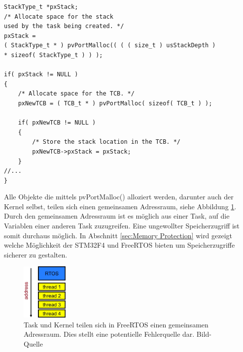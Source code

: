 \begin{lstlisting}[caption={FreeRTOS Source von xTaskCreate() aus Task.c. Jede Task bestitzt einen Stack und einen Task Control Block, beide werden beim Aufruf von xTaskCreate (Zeile 5 und Zeile 11) erstellt.}, linewidth=8cm,captionpos=b, label=lst:xTaskCreate, float=hbt]
StackType_t *pxStack;
/* Allocate space for the stack 
used by the task being created. */
pxStack = 
( StackType_t * ) pvPortMalloc(( ( ( size_t ) usStackDepth ) 
* sizeof( StackType_t ) ) );

if( pxStack != NULL )
{
	/* Allocate space for the TCB. */
	pxNewTCB = ( TCB_t * ) pvPortMalloc( sizeof( TCB_t ) );

	if( pxNewTCB != NULL )
	{
		/* Store the stack location in the TCB. */
		pxNewTCB->pxStack = pxStack;
	}
//...
}
\end{lstlisting}
Alle Objekte die mittels pvPortMalloc() alloziert werden, darunter auch der Kernel selbst, teilen sich einen gemeinsamen Adressraum, siehe Abbildung \ref{fig:AddressSpace}. Durch den gemeinsamen Adressraum ist es möglich aus einer Task, auf die Variablen einer anderen Task zuzugreifen. Eine ungewollter Speicherzugriff ist somit durchaus möglich. In Abschnitt \ref{sec:Memory Protection} wird gezeigt welche Möglichkeit der STM32F4 und FreeRTOS bieten um Speicherzugriffe sicherer zu gestalten.    
\begin{figure}[htb]
	\centering
		\includegraphics[width=0.2\textwidth]{Pictures/EmbeddedCom/addressSpace.jpg}
	\caption{Task und Kernel teilen sich in FreeRTOS einen gemeinsamen Adressraum. Dies stellt eine potentielle Fehlerquelle dar. Bild-Quelle~\protect{}}
	\label{fig:AddressSpace}
\end{figure}    

